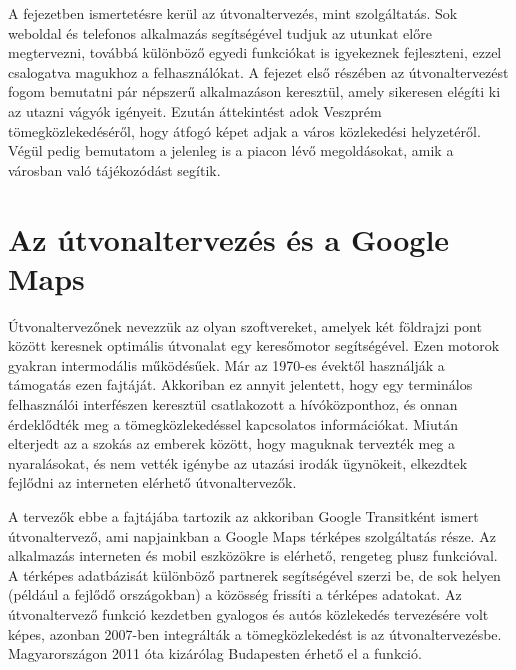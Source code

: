
A fejezetben ismertetésre kerül az útvonaltervezés, mint szolgáltatás. 
Sok weboldal és telefonos alkalmazás segítségével tudjuk az utunkat előre megtervezni, továbbá különböző egyedi funkciókat is igyekeznek fejleszteni, ezzel csalogatva magukhoz a felhasználókat. 
A fejezet első részében az útvonaltervezést fogom bemutatni pár népszerű alkalmazáson keresztül, amely sikeresen elégíti ki az utazni vágyók igényeit. 
Ezután áttekintést adok Veszprém tömegközlekedéséről, hogy átfogó képet adjak a város közlekedési helyzetéről. 
Végül pedig bemutatom a jelenleg is a piacon lévő megoldásokat, amik a városban való tájékozódást segítik. 


\section{Az útvonaltervezés és a Google Maps}
\label{utvonalterv}

Útvonaltervezőnek nevezzük az olyan szoftvereket, amelyek két földrajzi pont között keresnek optimális útvonalat egy keresőmotor segítségével. 
Ezen motorok gyakran intermodális működésűek. 
Már az 1970-es évektől használják a támogatás ezen fajtáját. 
Akkoriban ez annyit jelentett, hogy egy terminálos felhasználói interfészen keresztül csatlakozott a hívóközponthoz, és onnan érdeklődték meg a tömegközlekedéssel kapcsolatos információkat. 
Miután elterjedt az a szokás az emberek között, hogy maguknak tervezték meg a nyaralásokat, és nem vették igénybe az utazási irodák ügynökeit, elkezdtek fejlődni az interneten elérhető útvonaltervezők. 

A tervezők ebbe a fajtájába tartozik az akkoriban Google Transitként ismert útvonaltervező, ami napjainkban a Google Maps \cite{maps} térképes szolgáltatás része. 
Az alkalmazás interneten és mobil eszközökre is elérhető, rengeteg plusz funkcióval. 
A térképes adatbázisát különböző partnerek segítségével szerzi be, de sok helyen (például a fejlődő országokban) a közösség frissíti a térképes adatokat. 
Az útvonaltervező funkció kezdetben gyalogos és autós közlekedés tervezésére volt képes, azonban 2007-ben integrálták a tömegközlekedést is az útvonaltervezésbe. 
Magyarországon 2011 óta kizárólag Budapesten érhető el a funkció. 


